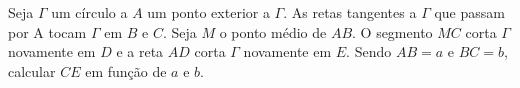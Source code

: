 Seja $\Gamma$ um círculo a $A$ um ponto exterior a $\Gamma$.
As retas tangentes a $\Gamma$ que passam por A tocam $\Gamma$ em $B$ e $C$.
Seja $M$ o ponto médio de $AB$.
O segmento $MC$ corta $\Gamma$ novamente em $D$ e a reta $AD$ corta $\Gamma$ novamente em $E$.
Sendo $AB = a$ e $BC = b$, calcular $CE$ em função de $a$ e $b$.